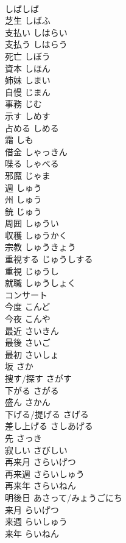 \documentclass[8pt]{extreport}
\begin{document}
\begin{CJK}{UTF8}{min}
\\	しばしば		
\\	芝生	しばふ	
\\	支払い	しはらい	
\\	支払う	しはらう	
\\	死亡	しぼう	
\\	資本	しほん	
\\	姉妹	しまい	
\\	自慢	じまん	
\\	事務	じむ	
\\	示す	しめす	
\\	占める	しめる	
\\	霜	しも	
\\	借金	しゃっきん	
\\	喋る	しゃべる	
\\	邪魔	じゃま	
\\	週	しゅう	
\\	州	しゅう	
\\	銃	じゅう	
\\	周囲	しゅうい	
\\	収穫	しゅうかく	
\\	宗教	しゅうきょう	
\\	重視する	じゅうしする	
\\	重視	じゅうし	
\\	就職	しゅうしょく	
\\	コンサート		
\\	今度	こんど	
\\	今夜	こんや	
\\	最近	さいきん	
\\	最後	さいご	
\\	最初	さいしょ	
\\	坂	さか	
\\	捜す/探す	さがす	
\\	下がる	さがる	
\\	盛ん	さかん	
\\	下げる/提げる	さげる	
\\	差し上げる	さしあげる	
\\	先	さっき	
\\	寂しい	さびしい	
\\	再来月	さらいげつ	
\\	再来週	さらいしゅう	
\\	再来年	さらいねん	
\\	明後日	あさって/みょうごにち	
\\	来月	らいげつ	
\\	来週	らいしゅう	
\\	来年	らいねん	

\end{CJK}
\end{document}
